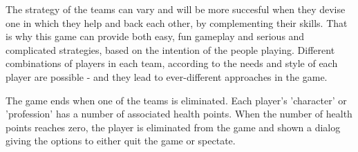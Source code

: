 The strategy of the teams can vary and will be more succesful when they devise
one in which they help and back each other, by complementing their skills. That
is why this game can provide both easy, fun gameplay and serious and complicated
strategies, based on the intention of the people playing. Different combinations
of players in each team, according to the needs and style of each player are
possible - and they lead to ever-different approaches in the game.\newline

The game ends when one of the teams is eliminated. Each player's 'character' or
'profession' has a number of associated health points. When the number of health
points reaches zero, the player is eliminated from the game and shown a dialog
giving the options to either quit the game or spectate.\newline


